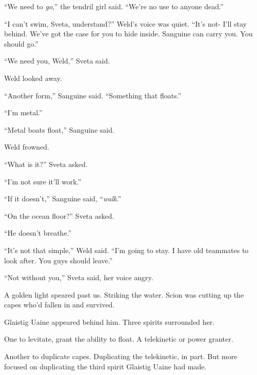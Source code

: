 ``We need to \emph{go},'' the tendril girl said.  ``We're no use to anyone dead.''



``I can't swim, Sveta, understand?'' Weld's voice was quiet.  ``It's not- I'll stay behind.  We've got the case for you to hide inside.  Sanguine can carry you.  You should go.''



``We need you, Weld,'' Sveta said.



Weld looked away.



``Another form,'' Sanguine said.  ``Something that floats.''



``I'm metal.''



``Metal boats float,'' Sanguine said.



Weld frowned.



``What is it?'' Sveta asked.



``I'm not sure it'll work.''



``If it doesn't,'' Sanguine said, ``\emph{walk}.''



``On the ocean floor?''  Sveta asked.



``He doesn't breathe.''



``It's not that simple,'' Weld said.  ``I'm going to stay.  I have old teammates to look after.  You guys should leave.''



``Not without you,'' Sveta said, her voice angry.



A golden light speared past us.  Striking the water.  Scion was cutting up the capes who'd fallen in and survived.



Glaistig Uaine appeared behind him.  Three spirits surrounded her.



One to levitate, grant the ability to float.  A telekinetic or power granter.



Another to duplicate capes.  Duplicating the telekinetic, in part.  But more focused on duplicating the third spirit Glaistig Uaine had made.



